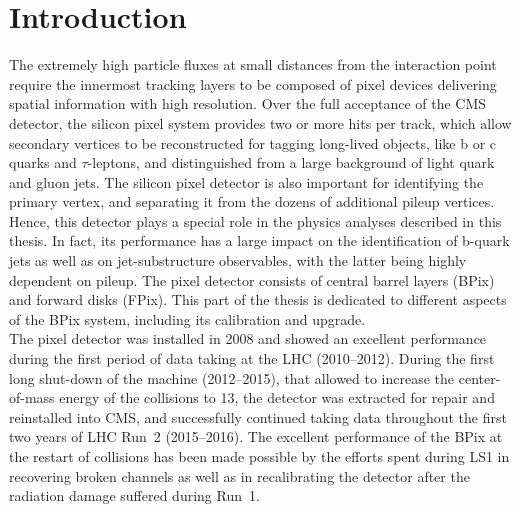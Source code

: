 \chapter{Introduction}\label{ch:BPixIntro}

The extremely high particle fluxes at small distances from the interaction point require the innermost tracking layers to be composed of pixel devices delivering spatial information with high resolution.
Over the full acceptance of the CMS detector, the silicon pixel system provides two or more hits per track, which allow secondary vertices to be reconstructed for tagging long-lived objects, like b or c quarks and $\tau$-leptons,
and distinguished from a large background of light quark and gluon jets. The silicon pixel detector is also important for identifying the primary vertex, and separating it from the dozens of additional pileup vertices.
Hence, this detector plays a special role in the physics analyses described in this thesis. In fact, its performance has a large impact on the identification of b-quark jets as well as on jet-substructure observables, with the latter being highly dependent on pileup.
The pixel detector consists of central barrel layers (BPix) and forward disks (FPix).
This part of the thesis is dedicated to different aspects of the BPix system, including its calibration and upgrade.\\ 

The pixel detector was installed in 2008 and showed an excellent performance during the first period of data taking at the LHC (2010--2012).
During the first long shut-down of the machine (2012--2015), that allowed to increase the center-of-mass energy of the collisions to 13\TeV, the detector was extracted for repair and reinstalled into CMS, and successfully continued taking data throughout the first two years of LHC Run~2 (2015--2016). The excellent performance of the BPix at the restart of collisions has been made possible by the efforts spent during LS1 in recovering broken channels as well as in recalibrating the detector after the radiation damage suffered during Run~1.

